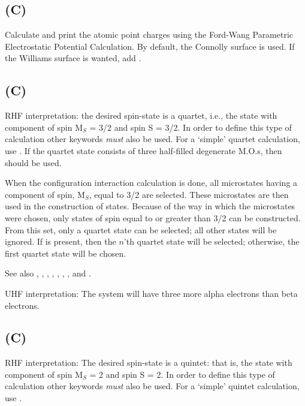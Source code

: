 \subsection*{ (C)}
Calculate and print the atomic point charges using
the Ford-Wang Parametric Electrostatic Potential Calculation.  By default, the
Connolly surface is used.  If the Williams surface is wanted, add .


\subsection*{ (C)}
        RHF interpretation:  the desired spin-state is a quartet, i.e.,  the
   state  with component of spin M$_S$ = 3/2 and spin S = 3/2.
In order to define this type of calculation
other keywords {\em must} also be used.  For a `simple' quartet calculation,
use . If the quartet state consists of three half-filled degenerate M.O.s,
then  should be used.


 When the configuration interaction calculation is done, all microstates having
a component of spin,  M$_S$, equal to 3/2 are selected.  These microstates are then
used in the construction of states.  Because of the way in which the microstates
were chosen, only states of spin equal to or greater than 3/2 can be constructed.
From this set, only a quartet state can be selected; all other states
will be ignored.
If  is present, then the $n$'th quartet state will be selected;
otherwise, the first quartet state will be  chosen.

See also , , , ,
, , ,  and .

        UHF interpretation:  The system will have three more alpha electrons
   than beta electrons.



\subsection*{ (C)}
        RHF interpretation:  The desired spin-state is a quintet:  that  is,
   the  state with component of spin M$_S$ = 2 and spin S = 2.
In order to define this type of calculation
other keywords {\em must} also be used.  For a `simple' quintet calculation,
use .


